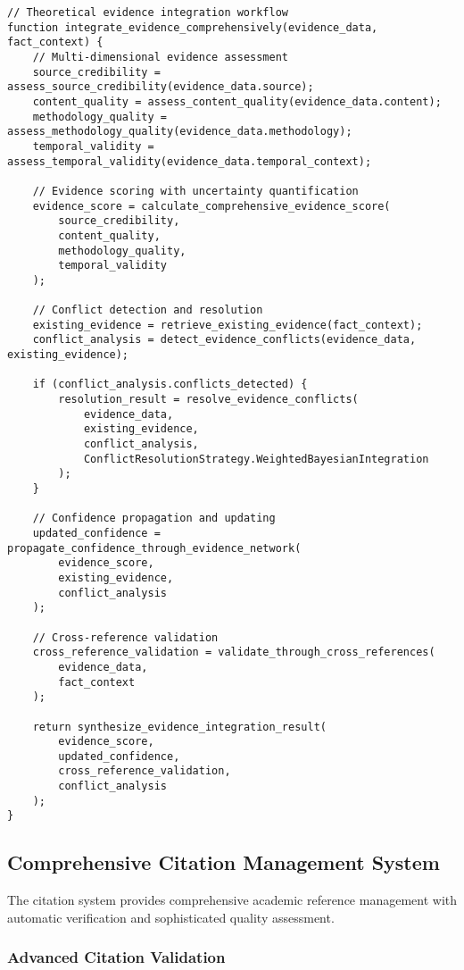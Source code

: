 \documentclass[12pt,a4paper,twoside]{article}
\begin{document}
\begin{lstlisting}[caption=Comprehensive Evidence Integration Process]
// Theoretical evidence integration workflow
function integrate_evidence_comprehensively(evidence_data, fact_context) {
    // Multi-dimensional evidence assessment
    source_credibility = assess_source_credibility(evidence_data.source);
    content_quality = assess_content_quality(evidence_data.content);
    methodology_quality = assess_methodology_quality(evidence_data.methodology);
    temporal_validity = assess_temporal_validity(evidence_data.temporal_context);

    // Evidence scoring with uncertainty quantification
    evidence_score = calculate_comprehensive_evidence_score(
        source_credibility,
        content_quality,
        methodology_quality,
        temporal_validity
    );

    // Conflict detection and resolution
    existing_evidence = retrieve_existing_evidence(fact_context);
    conflict_analysis = detect_evidence_conflicts(evidence_data, existing_evidence);

    if (conflict_analysis.conflicts_detected) {
        resolution_result = resolve_evidence_conflicts(
            evidence_data,
            existing_evidence,
            conflict_analysis,
            ConflictResolutionStrategy.WeightedBayesianIntegration
        );
    }

    // Confidence propagation and updating
    updated_confidence = propagate_confidence_through_evidence_network(
        evidence_score,
        existing_evidence,
        conflict_analysis
    );

    // Cross-reference validation
    cross_reference_validation = validate_through_cross_references(
        evidence_data,
        fact_context
    );

    return synthesize_evidence_integration_result(
        evidence_score,
        updated_confidence,
        cross_reference_validation,
        conflict_analysis
    );
}
\end{lstlisting}

\subsection{Comprehensive Citation Management System}

The citation system provides comprehensive academic reference management with automatic verification and sophisticated quality assessment.

\subsubsection{Advanced Citation Validation}
\end{document}

